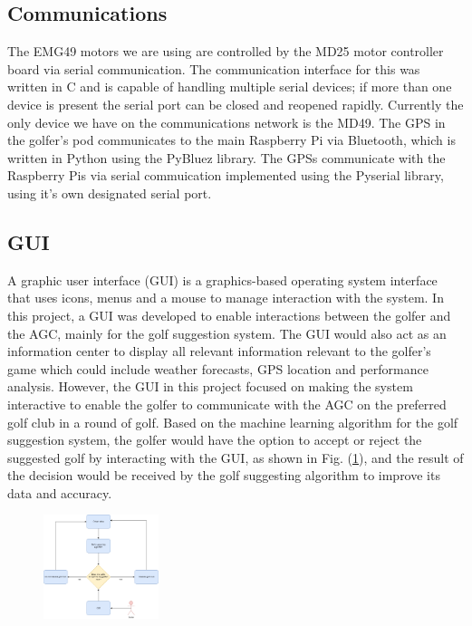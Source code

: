 \documentclass[11pt,landscape]{article}
\begin{document}
\begin{multicols}{3}

\subsection{Communications}
The EMG49 motors we are using are controlled by the MD25 motor controller board
via serial communication. The communication interface for this was written
in C and is capable of handling multiple serial devices; if more than one device
is present the serial port can be closed and reopened rapidly. Currently the
only device we have on the communications network is the MD49. The GPS in the
golfer's pod communicates to the main Raspberry Pi via Bluetooth, which is
written in Python using the PyBluez library. The GPSs communicate with the
Raspberry Pis via serial commuication implemented using the Pyserial library,
using it's own designated serial port.


\subsection{GUI}

A graphic user interface (GUI) is a graphics-based operating system interface
that uses icons, menus and a mouse to manage interaction with the system. In
this project, a GUI was developed to enable interactions between the golfer and
the AGC, mainly for the golf suggestion system. The GUI would also act as an
information center to display all relevant information relevant to the golfer’s
game which could include weather forecasts, GPS location and performance
analysis. However, the GUI in this project focused on making the system
interactive to enable the golfer to communicate with the AGC on the preferred
golf club in a round of golf. Based on the machine learning algorithm for the
golf suggestion system, the golfer would have the option to accept or reject the
suggested golf by interacting with the GUI, as shown in Fig. (\ref{fig:gui}),
and the result of the decision would be received by the golf suggesting
algorithm to improve its data and accuracy. 

\begin{figure}[H]
    \begin{center}
        \includegraphics[width=0.3\textwidth]{GUI.png}
    \end{center}
    \label{fig:gui}
\end{figure}


\end{multicols}
\end{document}
